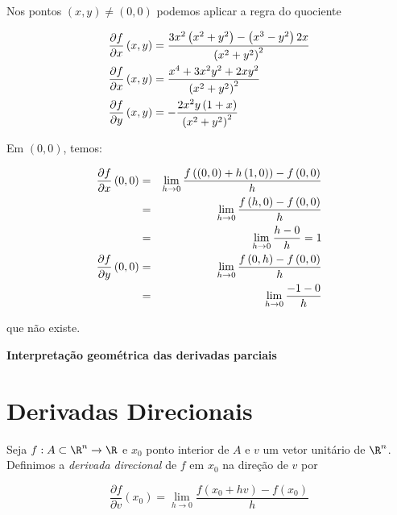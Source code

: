 \documentclass{book}
\begin{document}
\begin{sol}
    Nos pontos $\left( {x,y} \right) \ne \left( {0,0} \right)$ podemos aplicar a regra do quociente

\[
\begin{gathered}
\frac{{\partial f}}
{{\partial x}}\left( {x,y} \right) = \frac{{3x^2 \left( {x^2  + y^2 } \right) - \left( {x^3  - y^2 } \right)2x}}
{{\left( {x^2  + y^2 } \right)^2 }} \hfill \\
\frac{{\partial f}}
{{\partial x}}\left( {x,y} \right) = \frac{{x^4  + 3x^2 y^2  + 2xy^2 }}
{{\left( {x^2  + y^2 } \right)^2 }} \hfill \\
\frac{{\partial f}}
{{\partial y}}\left( {x,y} \right) =  - \frac{{2x^2 y\left( {1 + x} \right)}}
{{\left( {x^2  + y^2 } \right)^2 }} \hfill \\
\end{gathered}
\]

Em $(0,0)$, temos:

\begin{eqnarray*}
  \frac{{\partial f}}{{\partial x}}\left( {0,0} \right) &=& \mathop {\lim }\limits_{h \to 0} \frac{{f\left( {\left( {0,0} \right) + h\left( {1,0} \right)} \right) - f\left( {0,0} \right)}}{h} \hfill \\
   &=& \mathop {\lim }\limits_{h \to 0} \frac{{f\left( {h,0} \right) - f\left( {0,0} \right)}}{h} \hfill \\
&=& \mathop {\lim }\limits_{h \to 0} \frac{{h - 0}}
{h} = 1 \hfill \\
  \frac{{\partial f}}{{\partial y}}\left( {0,0} \right) &=& \mathop {\lim }\limits_{h \to 0} \frac{{f\left( {0,h} \right) - f\left( {0,0} \right)}}{h} \hfill \\
&=& \mathop {\lim }\limits_{h \to 0} \frac{{ - 1 - 0}}{h} \hfill \\
\end{eqnarray*}

que n\~ao existe.
\end{sol}

\textbf{Interpreta\c c\~ao geom\'etrica das derivadas parciais}


\section{Derivadas Direcionais} \label{sec13}

\begin{defn}
    Seja $f:A \subset \R^n \to \R$ e $x_0$ ponto interior de $A$ e $v$ um vetor unit\'ario de $\R^n$. Definimos a \textit{derivada direcional} de $f$ em $x_0$ na dire\c c\~ao de $v$ por

\[\boxed{
    \frac{{\partial f}}{{\partial v }}\left( {x_0 } \right) = \mathop {\lim }\limits_{h \to 0} \frac{{f\left( {x_0  + hv } \right) - f\left( {x_0 } \right)}}{h}}
\]

\end{defn}
\end{document}
